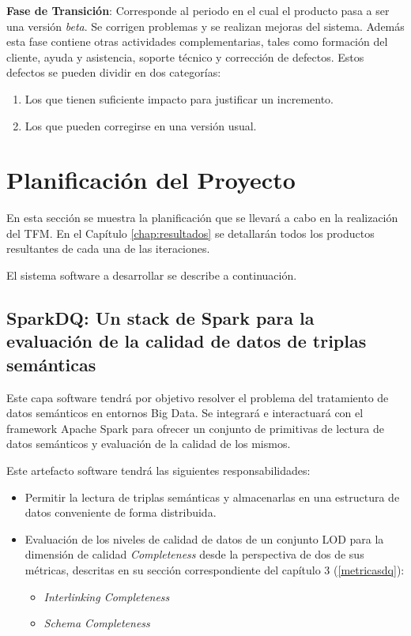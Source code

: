 \textbf{Fase de Transición}: Corresponde al periodo en el cual el producto pasa
a ser una versión \textit{beta}. Se corrigen problemas y se realizan mejoras del
sistema. Además esta fase contiene otras actividades complementarias, tales
como formación del cliente, ayuda y asistencia, soporte técnico y corrección de
defectos. Estos defectos se pueden dividir en dos categorías: 

\begin{enumerate}
\item Los que tienen suficiente impacto para justificar un incremento. 
\item Los que pueden corregirse en una versión usual. 
\end{enumerate}



\section{Planificación del Proyecto}

En esta sección se muestra la planificación que se llevará a cabo en la
realización del \acs{TFM}. En el Capítulo \ref{chap:resultados} se detallarán
todos los productos resultantes de cada una de las iteraciones. 

El sistema software a desarrollar se describe a continuación. 

\subsection{SparkDQ: Un stack de Spark para la evaluación de la calidad de datos
  de triplas semánticas} 

Este capa software tendrá por objetivo resolver el problema del tratamiento de
datos semánticos en entornos Big Data. Se integrará e interactuará con el
framework Apache Spark para ofrecer un conjunto de primitivas de lectura de
datos semánticos y evaluación de la calidad de los mismos.

Este artefacto software tendrá las siguientes responsabilidades:

\begin{itemize}
\item Permitir la lectura de triplas semánticas y almacenarlas en una estructura
  de datos conveniente de forma distribuida.
\item Evaluación de los niveles de calidad de datos de un conjunto \acs{LOD}
  para la dimensión de calidad \textit{Completeness} desde la perspectiva de dos
  de sus métricas, descritas en su sección correspondiente del capítulo 3 (\ref{metricasdq}):
  \begin{itemize}
  \item \textit{Interlinking Completeness}
  \item \textit{Schema Completeness}
  \end{itemize}
\end{itemize}

